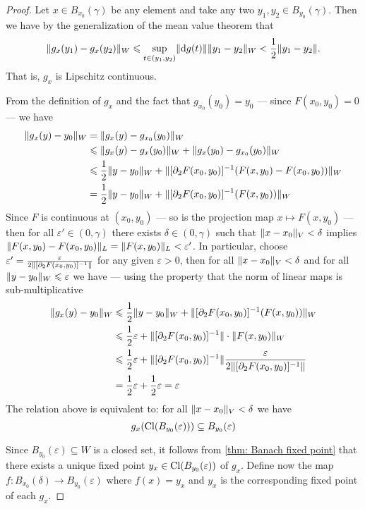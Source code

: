 \begin{proof}
Let \(x \in B_{x_0}(\gamma)\) be any element and take any two \(y_1, y_2 \in
B_{y_0}(\gamma)\). Then we have by the generalization of the mean value theorem
that
\[
  \lVert g_x(y_1) - g_x(y_{2})\rVert_{W} \leqslant \sup_{t \in (y_1, y_2)} \lVert\mathrm{d} g(t)\rVert
  \lVert y_1 - y_2\rVert_W < \frac{1}{2} \lVert y_1 - y_2\rVert.
\]
That is, \(g_x\) is Lipschitz continuous.

From the definition of \(g_x\) and the fact that \(g_{x_0}(y_0) = y_0\) ---
since \(F(x_0, y_0) = 0\) --- we have
\begin{align*}
  \lVert g_x(y) - y_0\rVert_W
  &= \lVert g_x(y) - g_{x_0}(y_0)\rVert_W \\
  &\leqslant \lVert g_x(y) - g_{x}(y_0)\rVert_W + \lVert g_x(y_0) - g_{x_0}(y_0)\rVert_W \\
  &\leqslant \frac{1}{2} \lVert y - y_0\rVert_W + \lVert[\partial_2F(x_0, y_0)]^{-1}(F(x, y_0) -
    F(x_0, y_0))\rVert_W \\
  &= \frac{1}{2} \lVert y - y_0\rVert_W
    + \lVert[\partial_{2}F(x_{0}, y_{0})]^{-1}(F(x, y_0))\rVert_W
\end{align*}
Since \(F\) is continuous at \((x_{0}, y_0)\) --- so is the projection
map \(x \mapsto F(x, y_0)\) --- then for all \(\varepsilon' \in (0, \gamma)\) there
exists \(\delta \in (0, \gamma)\) such that \(\lVert x - x_0\rVert_V < \delta\) implies \(\lVert F(x, y_0) -
  F(x_0, y_0)\rVert_L = \lVert F(x, y_0)\rVert_L < \varepsilon'\). In particular, choose \(\varepsilon' =
\frac{\varepsilon}{2 \lVert[\partial_{2}F(x_0, y_0)]^{-1}\rVert}\) for any given \(\varepsilon > 0\), then for
all \(\lVert x - x_0\rVert_V < \delta\) and for all \(\lVert y - y_0\rVert_W \leqslant \varepsilon\) we have --- using
the property that the norm of linear maps is sub-multiplicative
\begin{align*}
  \lVert g_x(y) - y_0\rVert_{W}
  &\leqslant \frac{1}{2} \lVert y - y_0\rVert_{W} + \lVert[\partial_2F(x_0, y_0)]^{-1}(F(x, y_0))\rVert_W
  \\
  &\leqslant \frac{1}{2} \varepsilon + \lVert[\partial_2F(x_0, y_0)]^{-1}\rVert \cdot \lVert F(x, y_0)\rVert_W
  \\
  &\leqslant \frac{1}{2}\varepsilon
    + \lVert[\partial_2F(x_0, y_0)]^{-1}\rVert \frac{\varepsilon}{2 \lVert[\partial_2F(x_0, y_0)]^{-1}\rVert}
  \\
  &= \frac{1}{2} \varepsilon + \frac{1}{2}\varepsilon = \varepsilon
\end{align*}
The relation above is equivalent to: for all \(\lVert x - x_0\rVert_V < \delta\) we
have
\[
  g_x(\operatorname{Cl}(B_{y_0}(\varepsilon))) \subseteq B_{y_0}(\varepsilon)
\]

Since \(B_{y_0}(\varepsilon) \subseteq W\) is a closed set, it follows from
\cref{thm: Banach fixed point} that there exists a unique fixed point
\(y_x \in \operatorname{Cl}(B_{y_0}(\varepsilon))\) of \(g_{x}\). Define now the map
\(f: B_{x_0}(\delta) \to B_{y_0}(\varepsilon)\) where \(f(x) = y_{x}\) and
\(y_x\) is the corresponding fixed point of each \(g_x\).


\end{proof}

